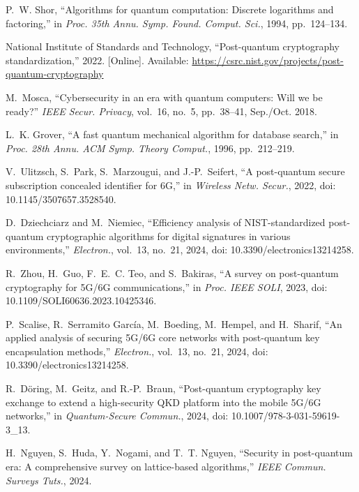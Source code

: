 \documentclass[11pt,a4paper]{article}
\begin{document}

\begin{thebibliography}{10}
P.~W. Shor, ``Algorithms for quantum computation: Discrete logarithms and factoring,'' in \emph{Proc. 35th Annu. Symp. Found. Comput. Sci.}, 1994, pp.~124--134.

National Institute of Standards and Technology, ``Post-quantum cryptography standardization,'' 2022. [Online]. Available: \url{https://csrc.nist.gov/projects/post-quantum-cryptography}

M.~Mosca, ``Cybersecurity in an era with quantum computers: Will we be ready?'' \emph{IEEE Secur. Privacy}, vol.~16, no.~5, pp.~38--41, Sep./Oct. 2018.

L.~K. Grover, ``A fast quantum mechanical algorithm for database search,'' in \emph{Proc. 28th Annu. ACM Symp. Theory Comput.}, 1996, pp.~212--219.

V.~Ulitzsch, S.~Park, S.~Marzougui, and J.-P.~Seifert, ``A post-quantum secure subscription concealed identifier for 6G,'' in \emph{Wireless Netw. Secur.}, 2022, doi: 10.1145/3507657.3528540.

D.~Dziechciarz and M.~Niemiec, ``Efficiency analysis of NIST-standardized post-quantum cryptographic algorithms for digital signatures in various environments,'' \emph{Electron.}, vol.~13, no.~21, 2024, doi: 10.3390/electronics13214258.

R.~Zhou, H.~Guo, F.~E.~C. Teo, and S.~Bakiras, ``A survey on post-quantum cryptography for 5G/6G communications,'' in \emph{Proc. IEEE SOLI}, 2023, doi: 10.1109/SOLI60636.2023.10425346.

P.~Scalise, R.~Serramito Garc\'{i}a, M.~Boeding, M.~Hempel, and H.~Sharif, ``An applied analysis of securing 5G/6G core networks with post-quantum key encapsulation methods,'' \emph{Electron.}, vol.~13, no.~21, 2024, doi: 10.3390/electronics13214258.

R.~D\"{o}ring, M.~Geitz, and R.-P.~Braun, ``Post-quantum cryptography key exchange to extend a high-security QKD platform into the mobile 5G/6G networks,'' in \emph{Quantum-Secure Commun.}, 2024, doi: 10.1007/978-3-031-59619-3\_13.

H.~Nguyen, S.~Huda, Y.~Nogami, and T.~T. Nguyen, ``Security in post-quantum era: A comprehensive survey on lattice-based algorithms,'' \emph{IEEE Commun. Surveys Tuts.}, 2024.
\end{thebibliography}
\end{document}
